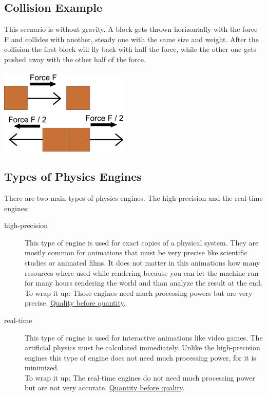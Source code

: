 \documentclass[DIV=calc, paper=a4, fontsize=11pt, twocolumn]{scrreprt}	 %
\begin{document}
        \subsection{Collision Example}
        This scenario is without gravity. A block gets thrown horizontally with the force F and collides with another, steady one with the same size and weight. After the collision the first block will fly back with half the force, while the other one gets pushed away with the other half of the force.\\\\
        \includegraphics{images/collision_example1.png}

        \subsection{Types of Physics Engines}
        There are two main types of physics engines. The high-precision and the real-time engines:
        \begin{description}
          \item[high-precision] This type of engine is used for exact copies of a physical system. They are mostly common for animations that must be very precise like scientific studies or animated films. It does not matter in this animations how many resources where used while rendering because you can let the machine run for many hours rendering the world and than analyze the result at the end.\\
            To wrap it up: Those engines need much processing powers but are very precise. \ul{Quality before quantity}.
          \item[real-time] This type of engine is used for interactive animations like video games. The artificial physics must be calculated immediately. Unlike the high-precision engines this type of engine does not need much processing power, for it is minimized.\\
            To wrap it up: The real-time engines do not need much processing power but are not very accurate. \ul{Quantity before quality}.
        \end{description}
\end{document}
